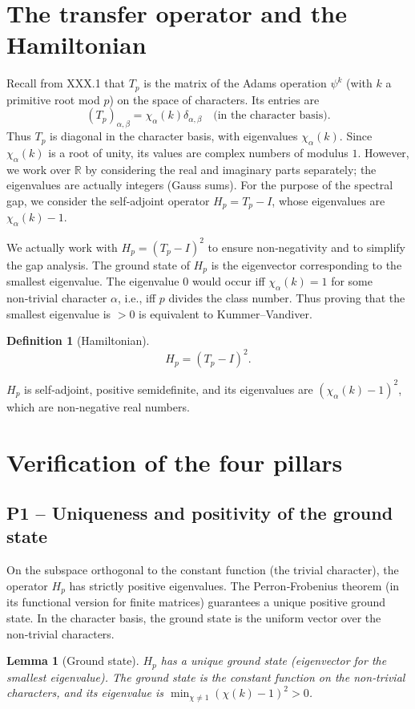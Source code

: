 \documentclass[11pt,a4paper]{article}
\newtheorem{lemma}[theorem]{Lemma}
\newtheorem{definition}[theorem]{Definition}
\begin{document}
\section{The transfer operator and the Hamiltonian}
Recall from XXX.1 that $T_p$ is the matrix of the Adams operation $\psi^k$ (with $k$ a primitive root mod $p$) on the space of characters. Its entries are
\[
(T_p)_{\alpha,\beta} = \chi_\alpha(k)\delta_{\alpha,\beta} \quad \text{(in the character basis)}.
\]
Thus $T_p$ is diagonal in the character basis, with eigenvalues $\chi_\alpha(k)$. Since $\chi_\alpha(k)$ is a root of unity, its values are complex numbers of modulus $1$. However, we work over $\mathbb{R}$ by considering the real and imaginary parts separately; the eigenvalues are actually integers (Gauss sums). For the purpose of the spectral gap, we consider the self‑adjoint operator $H_p = T_p - I$, whose eigenvalues are $\chi_\alpha(k) - 1$.

We actually work with $H_p = (T_p - I)^2$ to ensure non‑negativity and to simplify the gap analysis. The ground state of $H_p$ is the eigenvector corresponding to the smallest eigenvalue. The eigenvalue $0$ would occur iff $\chi_\alpha(k)=1$ for some non‑trivial character $\alpha$, i.e., iff $p$ divides the class number. Thus proving that the smallest eigenvalue is $>0$ is equivalent to Kummer–Vandiver.

\begin{definition}[Hamiltonian]
\[
H_p = (T_p - I)^2.
\]
\end{definition}
$H_p$ is self‑adjoint, positive semidefinite, and its eigenvalues are $(\chi_\alpha(k)-1)^2$, which are non‑negative real numbers.

\section{Verification of the four pillars}

\subsection{P1 – Uniqueness and positivity of the ground state}
On the subspace orthogonal to the constant function (the trivial character), the operator $H_p$ has strictly positive eigenvalues. The Perron‑Frobenius theorem (in its functional version for finite matrices) guarantees a unique positive ground state. In the character basis, the ground state is the uniform vector over the non‑trivial characters.

\begin{lemma}[Ground state]
$H_p$ has a unique ground state (eigenvector for the smallest eigenvalue). The ground state is the constant function on the non‑trivial characters, and its eigenvalue is $\min_{\chi \neq 1} (\chi(k)-1)^2 > 0$.
\end{lemma}
\end{document}
